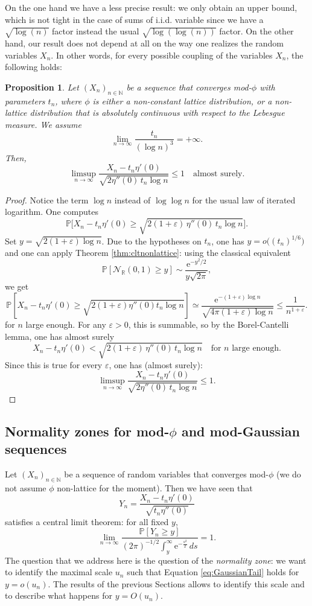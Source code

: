 \documentclass[12pt,a4paper,reqno]{amsart}
\newtheorem{proposition}[lemma]{Proposition}
\theoremstyle{remark}
\newcommand{\N}{\mathbb{N}}
\newcommand{\R}{\mathbb{R}}
\newcommand{\E}{\mathrm{e}}
\newcommand{\proba}{\mathbb{P}}
\newcommand{\eps}{\varepsilon}
\begin{document}
On the one hand we have a less precise result: we only obtain an upper bound, which is not tight in the case of sums of i.i.d. variable since we have a $\sqrt{\log(n)}$ factor instead the usual $\sqrt{\log(\log(n))}$ factor. On the other hand, our result does not depend at all on the way one realizes the random variables $X_{n}$. In other words, for every possible coupling of the variables $X_{n}$, the following holds:

\begin{proposition}
Let $(X_n)_{n \in \N}$ be a sequence that converges mod-$\phi$ with parameters $t_n$, where $\phi$ is either a non-constant lattice distribution, or a non-lattice distribution that is absolutely continuous with respect to the Lebesgue measure. We assume
$$\lim_{n \to \infty} \frac{t_n}{(\log n)^3} = +\infty.$$
Then,
$$\limsup_{n \to \infty} \frac{X_{n}-t_n \eta'(0)}{\sqrt{2\eta''(0)\,t_n\log n}} \leq 1 \quad\text{almost surely}.$$
\end{proposition}

\begin{proof}
Notice the term $\log n$ instead of $\log \log n$ for the usual law of iterated logarithm. One computes
$$\proba\big[X_{n}-t_n \eta'(0) \geq \sqrt{2 (1+\eps) \,\eta''(0)\, t_n \log n }\big].$$
Set $y=\sqrt{2 (1+\eps) \log n}$. Due to the hypotheses on $t_n$, one has $y=o\big( (t_n)^{1/6} \big)$ and one can apply Theorem \ref{thm:cltnonlattice}: using the classical equivalent 
\[\proba[\mathcal{N}_{\R}(0,1)\geq y] \sim \frac{\E^{-y^2/2}}{y\sqrt{2 \pi}},\]
we get
$$\proba\!\left[X_{n}-t_n \eta'(0)
\geq \sqrt{2 (1+\eps) \eta''(0) t_n \log n } \right]
\simeq \frac{\E^{-(1+\eps)\log n}}{\sqrt{4\pi (1+\eps) \log n}} \leq \frac{1}{n^{1+\eps}}.$$
for $n$ large enough. For any $\eps>0$, this is summable, so by the Borel-Cantelli lemma, one has almost surely 
$$X_{n}-t_n \eta'(0)<\sqrt{2(1+\eps)\,\eta''(0)\,t_n\log n}\quad\text{for $n$ large enough}.$$
Since this is true for every $\eps$, one has (almost surely): 
$$\limsup_{n \to \infty} \frac{X_{n}-t_n \eta'(0)}{\sqrt{2\eta''(0)\,t_n\log n}} \leq 1. $$
\end{proof}
\bigskip

\subsection{Normality zones for mod-\texorpdfstring{$\phi$}{phi} and mod-Gaussian sequences}
\label{subsec:normalityzone}
Let $(X_n)_{n\in \N}$ be a sequence of random variables that converges mod-$\phi$ (we do not assume $\phi$ non-lattice for the moment). Then we have seen that
$$Y_{n}=\frac{X_{n}-t_{n}\eta'(0)}{\sqrt{t_{n}\eta''(0)}}$$ 
satisfies a central limit theorem: for all fixed $y$,
\begin{equation}
    \label{eq:GaussianTail}
    \lim_{n \to \infty} \frac{\proba[Y_n \geq y]}{(2\pi)^{-1/2} \int_y^\infty \E^{-\frac{s^2}{2}} \,ds} =1.
\end{equation}
The question that we address here is the question of the {\em normality zone}: we want to identify the maximal scale $u_n$ such that Equation \eqref{eq:GaussianTail} holds for $y=o(u_n)$. The results of the previous Sections allows to identify this scale and to describe what happens for $y=O(u_n)$.
\bigskip
\end{document}
